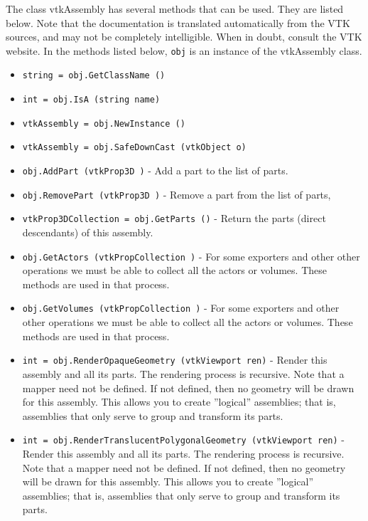 The class vtkAssembly has several methods that can be used.
  They are listed below.
Note that the documentation is translated automatically from the VTK sources,
and may not be completely intelligible.  When in doubt, consult the VTK website.
In the methods listed below, \verb|obj| is an instance of the vtkAssembly class.
\begin{itemize}
\item  \verb|string = obj.GetClassName ()|

\item  \verb|int = obj.IsA (string name)|

\item  \verb|vtkAssembly = obj.NewInstance ()|

\item  \verb|vtkAssembly = obj.SafeDownCast (vtkObject o)|

\item  \verb|obj.AddPart (vtkProp3D )| -  Add a part to the list of parts.

\item  \verb|obj.RemovePart (vtkProp3D )| -  Remove a part from the list of parts,

\item  \verb|vtkProp3DCollection = obj.GetParts ()| -  Return the parts (direct descendants) of this assembly.

\item  \verb|obj.GetActors (vtkPropCollection )| -  For some exporters and other other operations we must be
 able to collect all the actors or volumes. These methods
 are used in that process.

\item  \verb|obj.GetVolumes (vtkPropCollection )| -  For some exporters and other other operations we must be
 able to collect all the actors or volumes. These methods
 are used in that process.

\item  \verb|int = obj.RenderOpaqueGeometry (vtkViewport ren)| -  Render this assembly and all its parts. 
 The rendering process is recursive.
 Note that a mapper need not be defined. If not defined, then no geometry 
 will be drawn for this assembly. This allows you to create ''logical''
 assemblies; that is, assemblies that only serve to group and transform
 its parts.

\item  \verb|int = obj.RenderTranslucentPolygonalGeometry (vtkViewport ren)| -  Render this assembly and all its parts. 
 The rendering process is recursive.
 Note that a mapper need not be defined. If not defined, then no geometry 
 will be drawn for this assembly. This allows you to create ''logical''
 assemblies; that is, assemblies that only serve to group and transform
 its parts.


\end{itemize}
